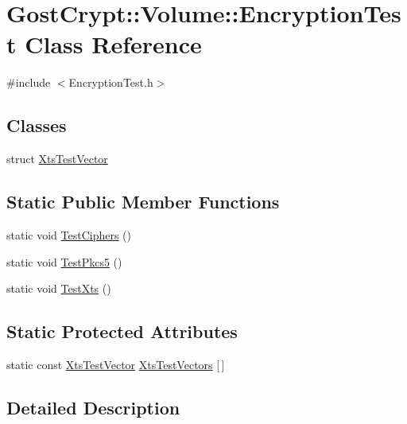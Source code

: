 \hypertarget{class_gost_crypt_1_1_volume_1_1_encryption_test}{}\section{Gost\+Crypt\+:\+:Volume\+:\+:Encryption\+Test Class Reference}
\label{class_gost_crypt_1_1_volume_1_1_encryption_test}


{\ttfamily \#include $<$Encryption\+Test.\+h$>$}

\subsection*{Classes}
\begin{DoxyCompactItemize}
\item 
struct \hyperlink{struct_gost_crypt_1_1_volume_1_1_encryption_test_1_1_xts_test_vector}{Xts\+Test\+Vector}
\end{DoxyCompactItemize}
\subsection*{Static Public Member Functions}
\begin{DoxyCompactItemize}
\item 
static void \hyperlink{class_gost_crypt_1_1_volume_1_1_encryption_test_a25580c967b4a214379bcb73ddfa14182}{Test\+Ciphers} ()
\item 
static void \hyperlink{class_gost_crypt_1_1_volume_1_1_encryption_test_aa738b4a5370d6399c405c6de9f0f4a81}{Test\+Pkcs5} ()
\item 
static void \hyperlink{class_gost_crypt_1_1_volume_1_1_encryption_test_aa28cdd852e4411f740a616712efb6966}{Test\+Xts} ()
\end{DoxyCompactItemize}
\subsection*{Static Protected Attributes}
\begin{DoxyCompactItemize}
\item 
static const \hyperlink{struct_gost_crypt_1_1_volume_1_1_encryption_test_1_1_xts_test_vector}{Xts\+Test\+Vector} \hyperlink{class_gost_crypt_1_1_volume_1_1_encryption_test_ab83d61ed8db4354a4598648808c65f26}{Xts\+Test\+Vectors} \mbox{[}$\,$\mbox{]}
\end{DoxyCompactItemize}


\subsection{Detailed Description}


